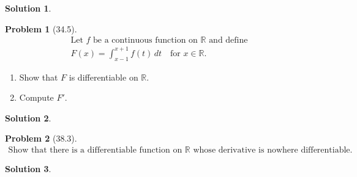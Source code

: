 \documentclass[12pt]{article}
\theoremstyle{definition} %
\newtheorem{solution}{Solution}
\newtheorem{problem}{Problem}
\theoremstyle{plain} %
\begin{document}
\begin{solution}
    
\end{solution}
\begin{problem}[34.5]
    \begin{align}
        \text{Let } f \text{ be a continuous function on } \mathbb{R} \text{ and define} \\
        F(x) = \int_{x-1}^{x+1} f(t) \, dt \quad \text{for } x \in \mathbb{R}.
    \end{align}
    \begin{enumerate}
        \item Show that $ F $ is differentiable on $ \mathbb{R} $.
        \item Compute $ F' $.
    \end{enumerate}
\end{problem}
\begin{solution}
    
\end{solution}
\begin{problem}[38.3]
    \begin{align}
        \text{Show that there is a differentiable function on } \mathbb{R} \text{ whose derivative is nowhere differentiable.}
    \end{align}
\end{problem}
\begin{solution}
    
\end{solution}
\end{document}
